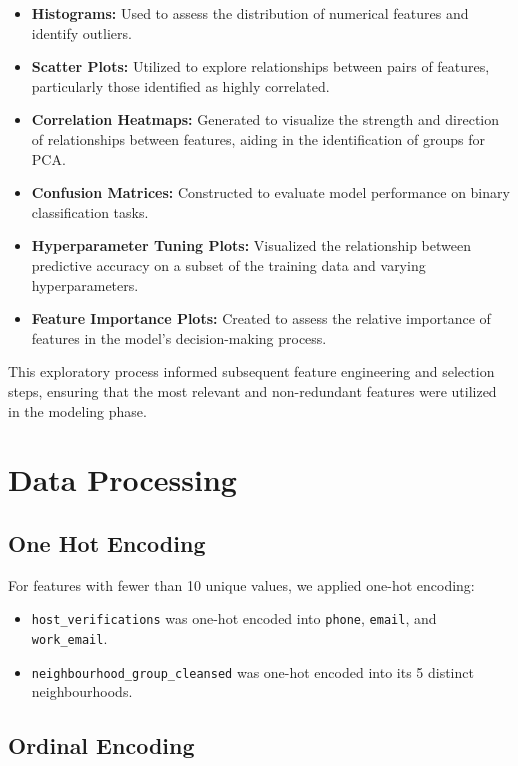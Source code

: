 \documentclass[12pt]{article}
\begin{document}
\begin{itemize}
    \item \textbf{Histograms:} Used to assess the distribution of numerical features and identify outliers.
    \item \textbf{Scatter Plots:} Utilized to explore relationships between pairs of features, particularly those identified as highly correlated.
    \item \textbf{Correlation Heatmaps:} Generated to visualize the strength and direction of relationships between features, aiding in the identification of groups for PCA.
    \item \textbf{Confusion Matrices:} Constructed to evaluate model performance on binary classification tasks.
    \item \textbf{Hyperparameter Tuning Plots:} Visualized the relationship between predictive accuracy on a subset of the training data and varying hyperparameters.
    \item \textbf{Feature Importance Plots:} Created to assess the relative importance of features in the model's decision-making process.
\end{itemize}

This exploratory process informed subsequent feature engineering and selection steps, ensuring that the most relevant and non-redundant features were utilized in the modeling phase.

\section{Data Processing}

\subsection{One Hot Encoding}

For features with fewer than 10 unique values, we applied one-hot encoding:

\begin{itemize}
    \item \texttt{host\_verifications} was one-hot encoded into \texttt{phone}, \texttt{email}, and \texttt{work\_email}.
    \item \texttt{neighbourhood\_group\_cleansed} was one-hot encoded into its 5 distinct neighbourhoods.
\end{itemize}

\subsection{Ordinal Encoding}
\end{document}
